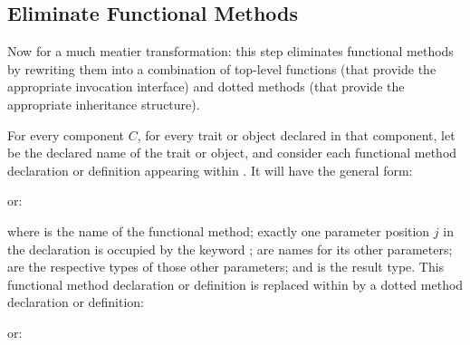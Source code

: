 \subsection{Eliminate Functional Methods}

Now for a much meatier transformation: this step eliminates
functional methods by rewriting them into a combination
of top-level functions (that provide the appropriate invocation interface)
and dotted methods (that provide the appropriate inheritance structure).

For every component $C$, for every trait or object declared in that component,
let  be the declared name of the trait or object, and
consider each functional method declaration or definition appearing
within .  It will have the general form:
\begin{codeexamplesize}
\begin{tabbing}
\end{tabbing}
\end{codeexamplesize}
or:
\begin{codeexamplesize}
\begin{tabbing}
\end{tabbing}
\end{codeexamplesize}
where  is the name of the functional method; exactly one parameter position $j$
in the declaration is occupied by the keyword ;  are names
for its other parameters;  are the respective
types of those other parameters; and  is the result type.  This functional method
declaration or definition is replaced within  by a dotted method declaration or
definition:
\begin{codeexamplesize}
\begin{tabbing}
\end{tabbing}
\end{codeexamplesize}
or:
\begin{codeexamplesize}
\begin{tabbing}
\end{tabbing}
\end{codeexamplesize}
